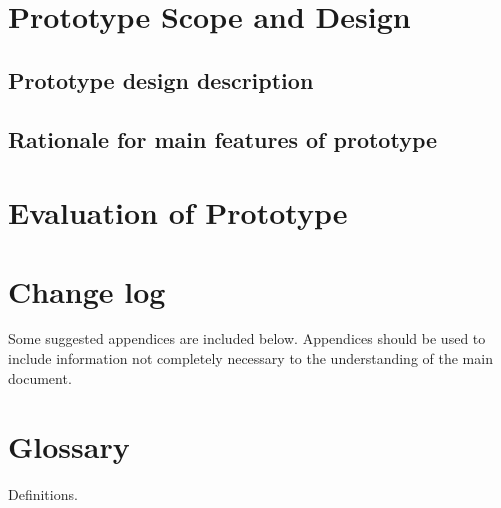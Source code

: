\documentclass{l3deliverable}
\begin{document}
\section{Prototype Scope and Design}


\subsection{Prototype design description}


\subsection{Rationale for main features of prototype}


\section{Evaluation of Prototype}


\section{Change log}


\appendix

Some suggested appendices are included below. Appendices should be
used to include information not completely necessary to the
understanding of the main document.

\section{Glossary}

Definitions.
\end{document}
